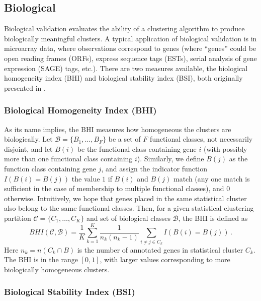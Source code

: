\documentclass[11pt]{article}
\begin{document}
\subsection{Biological}
\label{subsec:biological}

Biological validation evaluates the ability of a clustering algorithm
to produce biologically meaningful clusters.  A typical application of
biological validation is in microarray data, where observations
correspond to genes (where ``genes'' could be open reading frames
(ORFs), express sequence tags (ESTs), serial analysis of gene
expression (SAGE) tags,
etc.).  There are two measures available, the biological homogeneity index (BHI) and
biological stability index (BSI), both originally presented in \citet{Dat2006}.  

\subsubsection*{Biological Homogeneity Index (BHI)}

As its name implies, the BHI
measures how homogeneous the clusters are biologically.  
Let $\mathcal{B} = \{B_1, \ldots, B_F\}$ be a set of $F$ functional
classes, not necessarily disjoint, and let $B(i)$ be the functional
class containing gene $i$ (with possibly more
than one functional class containing $i$).  Similarly, we define
$B(j)$ as the function class containing gene $j$, and assign the
indicator function $I(B(i) = B(j))$ the value $1$ if $B(i)$ and $B(j)$
match (any one match is sufficient in the case of membership to
multiple functional classes), and 0 otherwise.  Intuitively, we hope that genes placed
in the same statistical cluster also belong to the same functional
classes.  Then, for a given statistical clustering
partition $\mathcal{C} = \{C_1, \ldots, C_K\}$ and set of biological
classes $\mathcal{B}$, the BHI is defined as 
$$
BHI(\mathcal{C},\mathcal{B}) = \frac{1}{K} \sum\limits_{k=1}^K
\frac{1}{n_k(n_k-1)} \sum\limits_{i\neq j \in C_k} I\left(B(i)=B(j)\right)\,.
$$
Here $n_k = n(C_k \cap B)$ is the number of annotated genes in
statistical cluster $C_k$. The BHI is in the range $[0,1]$, with
larger values corresponding to more biologically homogeneous clusters.

\subsubsection*{Biological Stability Index (BSI)}
\end{document}
